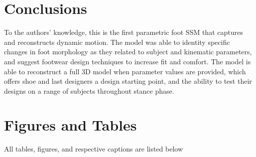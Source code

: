 \documentclass[preprint]{elsarticle}
\begin{document}
\hypertarget{conclusions}{%
\section{Conclusions}\label{conclusions}}

To the authors' knowledge, this is the first parametric foot SSM that captures and reconstructs dynamic motion.
The model was able to identity specific changes in foot morphology as they related to subject and kinematic parameters, and suggest footwear design techniques to increase fit and comfort.
The model is able to reconstruct a full 3D model when parameter values are provided, which offers shoe and last designers a design starting point, and the ability to test their designs on a range of subjects throughout stance phase.
\newpage

\hypertarget{figures-and-tables}{%
\section*{Figures and Tables}\label{figures-and-tables}}

All tables, figures, and respective captions are listed below
\end{document}
